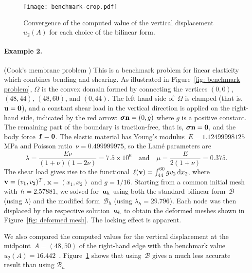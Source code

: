 \documentclass[11pt]{article}
\newcommand{\calB}{\mathcal{B}}
\newcommand{\vf}{{\bf f}}
\newcommand{\vn}{{\bf n}}
\newcommand{\vu}{{\bf u}}
\newcommand{\vv}{{\bf v}}
\newcommand{\bsx}{{\boldsymbol{x}}}
\newcommand{\vsigma}{\boldsymbol{\sigma}}
\numberwithin{equation}{section}
\newcommand{\ud}{\mathrm{d}}
\begin{document}
\begin{figure}
\centering
\texttt{[image: benchmark-crop.pdf]}
\caption{Convergence of the computed value of the vertical
displacement~$u_2(A)$ for each choice of the bilinear form.}
\label{fig: benchmark}
\end{figure}
\paragraph{Example 2.} (Cook’s membrane problem \cite{Cook1974}) This is a
benchmark problem for linear elasticity which combines bending and shearing.  As
illustrated in Figure~\ref{fig: benchmark problem}, $\Omega$ is the convex
domain formed by connecting the vertices $(0,0)$, $(48,44)$, $(48,60)$, and
$(0,44)$. The left-hand side of~$\Omega$ is clamped (that is,
$\vu=\mathbf{0}$), and a constant shear load in the vertical direction is
applied on the right-hand side, indicated by the red arrow: $\vsigma \vn =(0,g)$
where $g$ is a positive constant.  The remaining  part of the boundary is
traction-free, that is, $\vsigma \vn=\mathbf{0}$, and the body
force~$\vf=\mathbf{0}$.  The elastic material has Young's
modulus~$E=1.12499998125$ MPa and Poisson ratio~$\nu=0.499999975$, so  the
Lam\'e parameters are
\[
\lambda=\frac{E\nu}{(1+\nu)(1-2\nu)}=7.5\times10^6\quad\text{and}\quad
\mu= \frac{E}{2(1+\nu)}=0.375.
\]
The shear load gives rise to the
functional~$\ell(\vv) = \int_{44}^{60}g v_2\,\ud x_2$, where
$\vv=(v_1,v_2)^T$, $\bsx=(x_1,x_2)$ and $g=1/16$.  Starting from a common
initial mesh with~$h=2.57881$, we solved for~$\vu_h$ using both the
standard bilinear form~$\calB$ (using $\lambda$) and the modified
form~$\calB_h$ (using $\lambda_h=29.796$). Each node was then displaced by the
respective solution~$\vu_h$ to obtain the deformed meshes shown in
Figure~\ref{fig: deformed mesh}.  The locking effect is apparent.

We also compared the computed values for the vertical displacement at the
midpoint~$A=(48,50)$ of the right-hand edge with the benchmark value
$u_2(A)=16.442$~\cite[p.~3491]{LiuWang2022}.  Figure~\ref{fig: benchmark} shows
that using~$\calB$ gives a much less accurate result than using $\calB_h$
\end{document}
